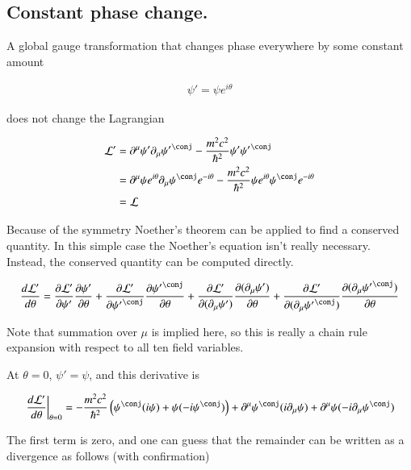 \subsection{Constant phase change. }

A global gauge transformation that changes phase everywhere by some constant amount

\begin{align*}
\psi' = \psi e^{i\theta}
\end{align*}

does not change the Lagrangian

\begin{align*}
\LL'
&= \partial^\mu \psi'  \partial_\mu {\psi'}^\conj - \frac{m^2 c^2}{\hbar^2}\psi' {\psi'}^\conj \\
&= \partial^\mu \psi e^{i\theta} \partial_\mu \psi^\conj e^{-i\theta} - \frac{m^2 c^2}{\hbar^2}\psi e^{i\theta}\psi^\conj e^{-i\theta} \\
&= \LL
\end{align*}

Because of the symmetry Noether's theorem can be applied to find a conserved quantity.  In this simple case the Noether's equation isn't really necessary.
Instead, the conserved quantity can be computed directly.

\begin{align*}
\frac{d\LL'}{d\theta}
&=
\PD{\psi'}{\LL'} \PD{\theta}{\psi'}
+\PD{{\psi'}^\conj}{\LL'} \PD{\theta}{{\psi'}^\conj}
+\PD{(\partial_\mu \psi')}{\LL'} \PD{\theta}{(\partial_\mu \psi')}
+\PD{(\partial_\mu {\psi'}^\conj)}{\LL'} \PD{\theta}{(\partial_\mu {\psi'}^\conj)} \\
\end{align*}

Note that summation over $\mu$ is implied here, so this is really a chain rule expansion with respect to all ten field variables.

At $\theta=0$, $\psi' = \psi$, and this derivative is

\begin{align*}
{\left. \frac{d\LL'}{d\theta} \right\vert}_{\theta=0}
&=
-\frac{m^2 c^2}{\hbar^2}\left( \psi^\conj (i \psi) + \psi (-i\psi^\conj) \right)
+ \partial^\mu \psi^\conj (i\partial_\mu \psi)
+ \partial^\mu \psi (-i \partial_\mu {\psi}^\conj) \\
\end{align*}

The first term is zero, and one can guess that the remainder can be written as a divergence as follows (with confirmation)

